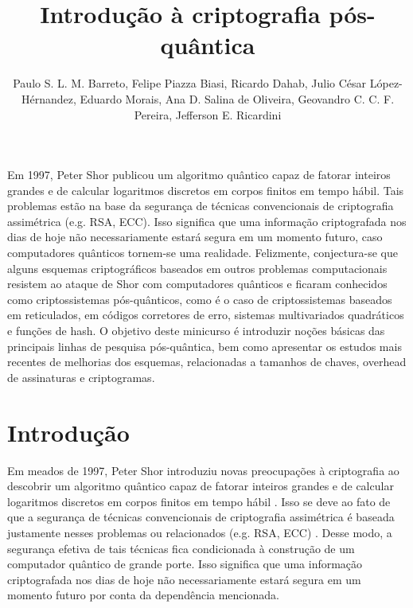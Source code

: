 \documentclass{SBCbookchapter}
\author{Paulo S. L. M. Barreto, Felipe Piazza Biasi, Ricardo Dahab, Julio César López-Hérnandez, Eduardo Morais, Ana D. Salina de Oliveira, Geovandro C. C. F. Pereira, Jefferson E. Ricardini}
\title{Introdução à criptografia pós-quântica}
\begin{document}
\begin{otherlanguage}{brazilian}
\pagestyle{empty}

\maketitle


\begin{resumo}
\begin{otherlanguage}{brazilian}
Em 1997, Peter Shor publicou um algoritmo quântico capaz de fatorar inteiros grandes e de calcular logaritmos discretos em corpos finitos em tempo hábil. Tais problemas estão na base da segurança de técnicas convencionais de criptografia assimétrica  (e.g. RSA, ECC). Isso significa que uma informação criptografada nos dias de hoje não necessariamente estará segura em um momento futuro, caso computadores quânticos tornem-se uma realidade. Felizmente, conjectura-se que alguns esquemas criptográficos baseados em outros problemas computacionais resistem ao ataque de Shor com computadores quânticos e ficaram conhecidos como criptossistemas pós-quânticos, como é o caso de criptossistemas baseados em reticulados, em códigos corretores de erro, sistemas multivariados quadráticos e funções de hash. O objetivo deste minicurso é introduzir noções básicas das principais linhas de pesquisa pós-quântica, bem como apresentar os estudos mais recentes de melhorias dos esquemas, relacionadas a tamanhos de chaves, overhead de assinaturas e criptogramas.
\end{otherlanguage}
\end{resumo}


\section{Introdução}

Em meados de 1997, Peter Shor introduziu novas preocupações à criptografia ao descobrir um algoritmo quântico capaz de fatorar inteiros grandes e de calcular logaritmos discretos em corpos finitos em tempo hábil \cite{shor}. Isso se deve ao fato de que a segurança de técnicas convencionais de criptografia assimétrica é baseada justamente nesses problemas ou relacionados (e.g. RSA, ECC) \cite{rivest-shamir-adleman,miller}. Desse modo, a segurança efetiva de tais técnicas fica condicionada à construção de um computador quântico de grande porte. Isso significa que uma informação criptografada nos dias de hoje não necessariamente estará segura em um momento futuro por conta da dependência mencionada. 


\end{otherlanguage}
\end{document}
